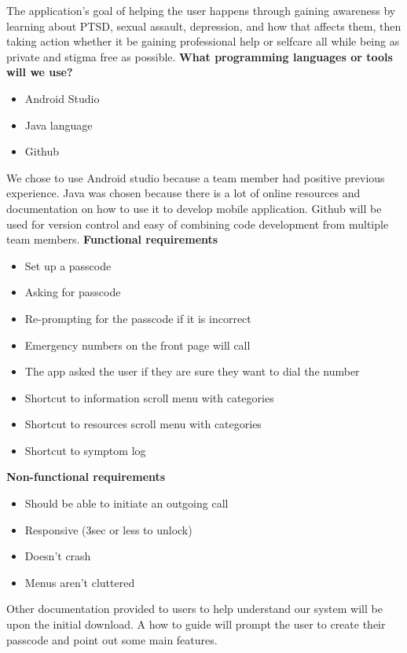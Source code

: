 \documentclass[letterpaper,12pt,titlepage]{article}
\begin{document}
\newline
\newline
The application’s goal of helping the user happens through gaining awareness by learning about PTSD, sexual assault, depression, and how that affects them, then taking action whether it be gaining professional help or selfcare all while being as private and stigma free as possible.
\newline
\newline
\textbf{What programming languages or tools will we use?}
\begin{itemize}
  \item Android Studio
  \item Java language
  \item Github
\end{itemize}
We chose to use Android studio because a team member had positive previous experience. Java was chosen because there is a lot of online resources and documentation on how to use it to develop mobile application. Github will be used for version control and easy of combining code development from multiple team members.
\newline
\newline
\textbf{Functional requirements}
\begin{itemize}
  \item Set up a passcode 
  \item Asking for passcode
  \item Re-prompting for the passcode if it is incorrect
  \item Emergency numbers on the front page will call
  \item The app asked the user if they are sure they want to dial the number
  \item Shortcut to information scroll menu with categories
  \item Shortcut to resources scroll menu with categories
  \item Shortcut to symptom log
\end{itemize}
\noindent
\textbf{Non-functional requirements}
\begin{itemize}
  \item Should be able to initiate an outgoing call
  \item Responsive (3sec or less to unlock)
  \item Doesn’t crash
  \item Menus aren’t cluttered
\end{itemize}
Other documentation provided to users to help understand our system will be upon the initial download. A how to guide will prompt the user to create their passcode and point out some main features.
\end{document}
